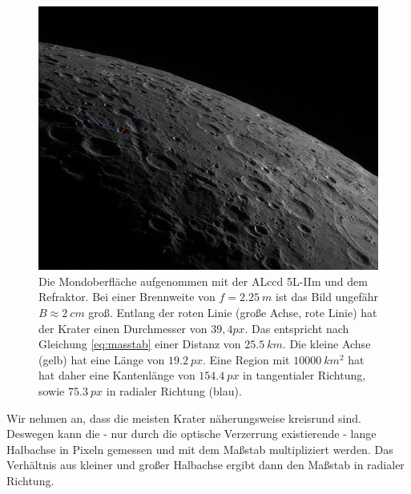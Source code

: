 \documentclass[10pt,a4paper,titlepage]{article}
\begin{document}
\begin{figure}[h!]
  \centering
    \includegraphics[width=1\textwidth]{Mondkrater}
  \caption{Die Mondoberfläche aufgenommen mit der ALccd 5L-IIm und dem Refraktor. Bei einer Brennweite von $f = \SI{2,25}{m}$ ist das Bild ungefähr $B \approx \SI{2}{cm}$ groß. Entlang der roten Linie (große Achse, rote Linie) hat der Krater einen Durchmesser von $39,4 px$. Das entspricht nach Gleichung \ref{eq:masstab} einer Distanz von $\SI{25,5}{km}$. Die kleine Achse (gelb) hat eine Länge von $\SI{19,2}{px}$. Eine Region mit $\SI{10000}{km^2}$ hat hat daher eine Kantenlänge von $\SI{154,4}{px}$ in tangentialer Richtung, sowie $\SI{75,3}{px}$ in radialer Richtung (blau).}
  \label{fig:mondkrater}
\end{figure}

Wir nehmen an, dass die meisten Krater näherungsweise kreisrund sind. Deswegen kann die - nur durch die optische Verzerrung existierende - lange Halbachse in Pixeln gemessen und mit dem Maßstab multipliziert werden. Das Verhältnis aus kleiner und großer Halbachse ergibt dann den Maßstab in radialer Richtung.
\end{document}
